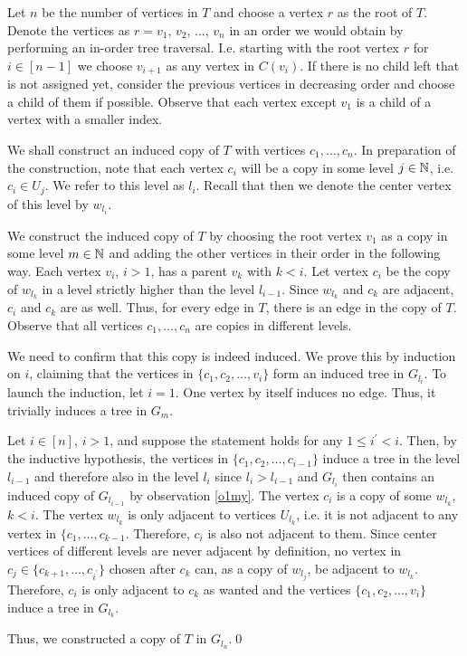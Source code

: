 \begin{prf}
Let $n$ be the number of vertices in $T$ and choose a vertex $r$ as the root of $T$. Denote the vertices as $r=v_1$, $v_2$, ..., $v_n$ in an order we would obtain by performing an in-order tree traversal. I.e. starting with the root vertex $r$ for $i\in [n-1]$ we choose $v_{i+1}$ as any vertex in $C(v_i)$. If there is no child left that is not assigned yet, consider the previous vertices in decreasing order and choose a child of them if possible. Observe that each vertex except $v_1$ is a child of a vertex with a smaller index.

We shall construct an induced copy of $T$ with vertices $c_1,\dots ,c_n$. 
In preparation of the construction, note that each vertex $c_i$ will be a copy in some level $j\in\mathbb{N}$, i.e. $c_i\in U_j$. We refer to this level as $l_i$. Recall that then we denote the center vertex of this level by $w_{l_i}$.

We construct the induced copy of $T$ by choosing the root vertex $v_1$ as a copy in some level $m\in\mathbb{N}$ and adding the other vertices in their order in the following way. Each vertex $v_i$, $i>1$, has a parent $v_k$ with $k<i$. Let vertex $c_i$ be the copy of $w_{l_k}$ in a level strictly higher than the level  $l_{i-1}$. Since $w_{l_k}$ and $c_k$ are adjacent, $c_i$ and $c_k$ are as well. Thus, for every edge in $T$, there is an edge in the copy of $T$. Observe that all vertices $c_1,\dots , c_n$ are copies in different levels. 

We need to confirm that this copy is indeed induced. We prove this by induction on $i$, claiming that the vertices in $\lbrace c_1, c_2, \dots , v_i\rbrace$ form an induced tree in $G_{l_i}$. To launch the induction, let $i=1$. One vertex by itself induces no edge. Thus, it trivially induces a tree in $G_m$.

Let $i\in [n]$, $i>1$, and suppose the statement holds for any $1\leq i^\prime < i$. Then, by the inductive hypothesis, the vertices in $\lbrace c_1, c_2, \dots , c_{i-1}\rbrace$ induce a tree in the level $l_{i-1}$ and therefore also in the level $l_i$ since $l_i >l_{i-1}$ and $G_{l_i}$ then contains an induced copy of $G_{l_{i-1}}$ by observation \ref{o1my}. The vertex $c_i$ is a copy of some $w_{l_k}$, $k<i$. The vertex $w_{l_k}$ is only adjacent to vertices $U_{l_k}$, i.e. it is not adjacent to any vertex in $\lbrace c_1, \dots , c_{k-1}$. Therefore, $c_i$ is also not adjacent to them. Since center vertices of different levels are never adjacent by definition, no vertex in $c_j\in\lbrace c_{k+1}, \dots ,c_{i^\prime}\rbrace$ chosen after $c_k$ can, as a copy of $w_{l_j}$, be adjacent to $w_{l_k}$. Therefore, $c_i$ is only adjacent to $c_k$ as wanted and the vertices $\lbrace c_1, c_2, \dots , v_i\rbrace$ induce a tree in $G_{l_k}$.

Thus, we constructed a copy of $T$ in $G_{l_n}$.\qed
\end{prf}
